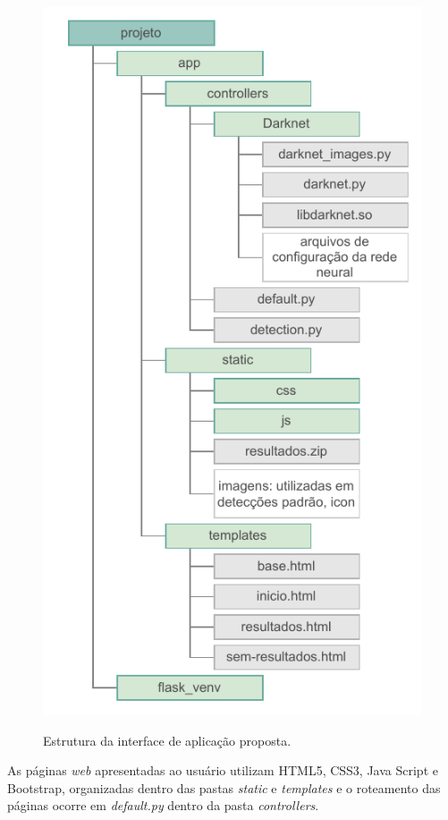 \begin{figure}[!h] %
  \centering
  \caption{Estrutura da interface de aplicação proposta.}
  \includegraphics[scale=1.05]{img/img-resultados-api-estrutura.pdf}
  \label{fig:resultados-api-estrutura}
\end{figure}

As páginas \textit{web} apresentadas ao usuário utilizam HTML5, CSS3, Java Script e Bootstrap, organizadas dentro das pastas \textit{static} e \textit{templates} e o roteamento das páginas ocorre em \textit{default.py} dentro da pasta \textit{controllers}.


